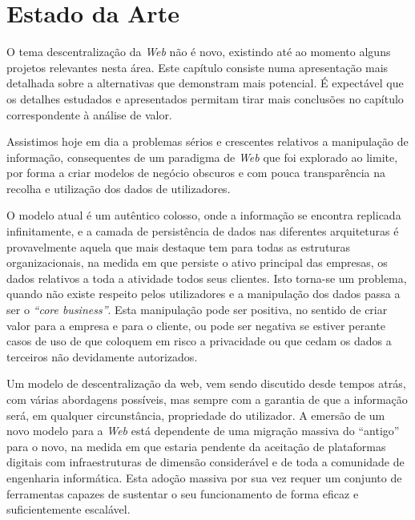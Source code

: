 \chapter{Estado da Arte \label{chapter_estado_arte}}
\label{cap:2}

O tema descentralização da \emph{Web} não é novo, existindo até ao momento alguns projetos relevantes nesta área.
Este capítulo consiste numa apresentação mais detalhada sobre a alternativas que demonstram mais potencial.
É expectável que os detalhes estudados e apresentados permitam tirar mais conclusões no capítulo correspondente à análise de valor.

Assistimos hoje em dia a problemas sérios e crescentes relativos a manipulação de informação, consequentes de um paradigma de \emph{Web} que foi explorado ao limite, por forma a criar modelos de negócio obscuros e com pouca transparência na recolha e utilização dos dados de utilizadores.

O modelo atual é um autêntico colosso, onde a informação se encontra replicada infinitamente, e a camada de persistência de dados nas diferentes arquiteturas é provavelmente aquela que mais destaque tem para todas as estruturas organizacionais, na medida em que persiste o ativo principal das empresas, os dados relativos a toda a atividade todos seus clientes\cite{top_three_issues_centralized_web}. Isto torna-se um problema, quando não existe respeito pelos utilizadores e a manipulação dos dados passa a ser o \emph{“core business”}. Esta manipulação pode ser positiva, no sentido de criar valor para a empresa e para o cliente, ou pode ser negativa se estiver perante casos de uso de que coloquem em risco a privacidade ou que cedam os dados a terceiros não devidamente autorizados\cite{facebook_data_hell_medium}.

Um modelo de descentralização da web, vem sendo discutido desde tempos atrás, com várias abordagens possíveis, mas sempre com a garantia de que a informação será, em qualquer circunstância, propriedade do utilizador\cite{why_web_decentralization_future}.
A emersão de um novo modelo para a \emph{Web} está dependente de uma migração massiva do “antigo” para o novo, na medida em que estaria pendente da aceitação de plataformas digitais com infraestruturas de dimensão considerável e de toda a comunidade de engenharia informática. Esta adoção massiva por sua vez requer um conjunto de ferramentas capazes de sustentar o seu funcionamento de forma eficaz e suficientemente escalável\cite{shift_power_to_users}.

